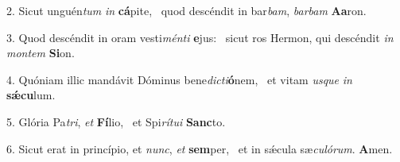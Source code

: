 2. Sicut unguén\textit{tum} \textit{in} \textbf{cá}pite, \ast\  quod descéndit in bar\textit{bam}, \textit{bar}\textit{bam} \textbf{A}\textbf{a}ron.\

3. Quod descéndit in oram vesti\textit{mén}\textit{ti} \textbf{e}jus: \ast\  sicut ros Hermon, qui descéndit \textit{in} \textit{mon}\textit{tem} \textbf{Si}on.\

4. Quóniam illic mandávit Dóminus bene\textit{dic}\textit{ti}\textbf{ó}nem, \ast\  et vitam \textit{us}\textit{que} \textit{in} \textbf{sǽ}\textbf{cu}lum.\

5. Glória Pa\textit{tri}, \textit{et} \textbf{Fí}lio, \ast\  et Spi\textit{rí}\textit{tu}\textit{i} \textbf{Sanc}to.\

6. Sicut erat in princípio, et \textit{nunc}, \textit{et} \textbf{sem}per, \ast\  et in sǽcula sæ\textit{cu}\textit{ló}\textit{rum}. \textbf{A}men.\


